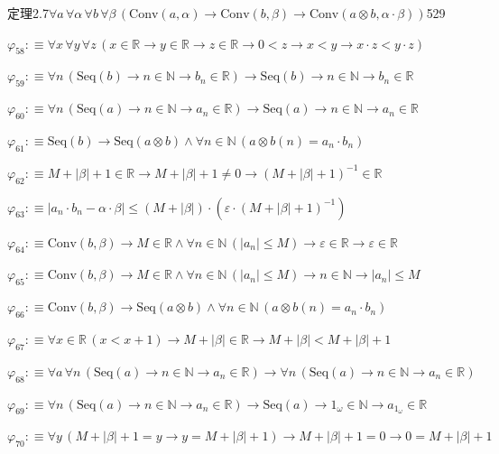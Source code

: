 \begin{fullproof}{定理2.7}{$\forall a\,\forall \alpha\,\forall b\,\forall \beta\,(\mathrm{Conv}(a,\alpha) \to \mathrm{Conv}(b,\beta) \to \mathrm{Conv}(a \otimes b,\alpha \cdot \beta))$}{529}
\begin{abbrevlist}
\item $\varphi_{58} :\equiv \forall x\,\forall y\,\forall z\,(x \in \mathbb{R} \to y \in \mathbb{R} \to z \in \mathbb{R} \to 0 < z \to x < y \to x \cdot z < y \cdot z)$
\item $\varphi_{59} :\equiv \forall n\,(\mathrm{Seq}(b) \to n \in \mathbb{N} \to b_{n} \in \mathbb{R}) \to \mathrm{Seq}(b) \to n \in \mathbb{N} \to b_{n} \in \mathbb{R}$
\item $\varphi_{60} :\equiv \forall n\,(\mathrm{Seq}(a) \to n \in \mathbb{N} \to a_{n} \in \mathbb{R}) \to \mathrm{Seq}(a) \to n \in \mathbb{N} \to a_{n} \in \mathbb{R}$
\item $\varphi_{61} :\equiv \mathrm{Seq}(b) \to \mathrm{Seq}(a \otimes b) \land \forall n \in \mathbb{N}\,(a \otimes b(n) = a_{n} \cdot b_{n})$
\item $\varphi_{62} :\equiv M + \lvert \beta \rvert + 1 \in \mathbb{R} \to M + \lvert \beta \rvert + 1 \neq 0 \to (M + \lvert \beta \rvert + 1)^{-1} \in \mathbb{R}$
\item $\varphi_{63} :\equiv \lvert a_{n} \cdot b_{n} - \alpha \cdot \beta \rvert \leq (M + \lvert \beta \rvert) \cdot (\varepsilon \cdot (M + \lvert \beta \rvert + 1)^{-1})$
\item $\varphi_{64} :\equiv \mathrm{Conv}(b,\beta) \to M \in \mathbb{R} \land \forall n \in \mathbb{N}\,(\lvert a_{n} \rvert \leq M) \to \varepsilon \in \mathbb{R} \to \varepsilon \in \mathbb{R}$
\item $\varphi_{65} :\equiv \mathrm{Conv}(b,\beta) \to M \in \mathbb{R} \land \forall n \in \mathbb{N}\,(\lvert a_{n} \rvert \leq M) \to n \in \mathbb{N} \to \lvert a_{n} \rvert \leq M$
\item $\varphi_{66} :\equiv \mathrm{Conv}(b,\beta) \to \mathrm{Seq}(a \otimes b) \land \forall n \in \mathbb{N}\,(a \otimes b(n) = a_{n} \cdot b_{n})$
\item $\varphi_{67} :\equiv \forall x \in \mathbb{R}\,(x < x + 1) \to M + \lvert \beta \rvert \in \mathbb{R} \to M + \lvert \beta \rvert < M + \lvert \beta \rvert + 1$
\item $\varphi_{68} :\equiv \forall a\,\forall n\,(\mathrm{Seq}(a) \to n \in \mathbb{N} \to a_{n} \in \mathbb{R}) \to \forall n\,(\mathrm{Seq}(a) \to n \in \mathbb{N} \to a_{n} \in \mathbb{R})$
\item $\varphi_{69} :\equiv \forall n\,(\mathrm{Seq}(a) \to n \in \mathbb{N} \to a_{n} \in \mathbb{R}) \to \mathrm{Seq}(a) \to 1_{\omega} \in \mathbb{N} \to a_{1_{\omega}} \in \mathbb{R}$
\item $\varphi_{70} :\equiv \forall y\,(M + \lvert \beta \rvert + 1 = y \to y = M + \lvert \beta \rvert + 1) \to M + \lvert \beta \rvert + 1 = 0 \to 0 = M + \lvert \beta \rvert + 1$

\end{abbrevlist}
\end{fullproof}
